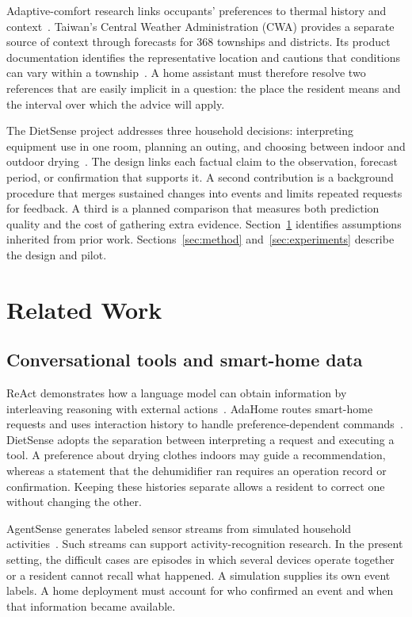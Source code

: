 \documentclass[conference]{IEEEtran}
\begin{document}
Adaptive-comfort research links occupants' preferences to thermal history and context~\cite{deDear}. Taiwan's Central Weather Administration (CWA) provides a separate source of context through forecasts for 368 townships and districts. Its product documentation identifies the representative location and cautions that conditions can vary within a township~\cite{cwa}. A home assistant must therefore resolve two references that are easily implicit in a question: the place the resident means and the interval over which the advice will apply.

The DietSense project addresses three household decisions: interpreting equipment use in one room, planning an outing, and choosing between indoor and outdoor drying~\cite{project}. The design links each factual claim to the observation, forecast period, or confirmation that supports it. A second contribution is a background procedure that merges sustained changes into events and limits repeated requests for feedback. A third is a planned comparison that measures both prediction quality and the cost of gathering extra evidence. Section~\ref{sec:related} identifies assumptions inherited from prior work. Sections~\ref{sec:method} and~\ref{sec:experiments} describe the design and pilot.

\section{Related Work}\label{sec:related}
\subsection{Conversational tools and smart-home data}
ReAct demonstrates how a language model can obtain information by interleaving reasoning with external actions~\cite{react}. AdaHome routes smart-home requests and uses interaction history to handle preference-dependent commands~\cite{adahome}. DietSense adopts the separation between interpreting a request and executing a tool. A preference about drying clothes indoors may guide a recommendation, whereas a statement that the dehumidifier ran requires an operation record or confirmation. Keeping these histories separate allows a resident to correct one without changing the other.

AgentSense generates labeled sensor streams from simulated household activities~\cite{agentsense}. Such streams can support activity-recognition research. In the present setting, the difficult cases are episodes in which several devices operate together or a resident cannot recall what happened. A simulation supplies its own event labels. A home deployment must account for who confirmed an event and when that information became available.
\end{document}
